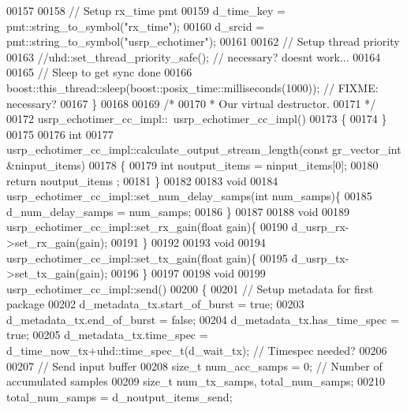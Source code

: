 \begin{DoxyCode}
00157 
00158         \textcolor{comment}{// Setup rx\_time pmt}
00159         d_time_key = pmt::string\_to\_symbol(\textcolor{stringliteral}{"rx\_time"});
00160         d_srcid = pmt::string\_to\_symbol(\textcolor{stringliteral}{"usrp\_echotimer"});
00161 
00162         \textcolor{comment}{// Setup thread priority}
00163         \textcolor{comment}{//uhd::set\_thread\_priority\_safe(); // necessary? doesnt work...}
00164 
00165         \textcolor{comment}{// Sleep to get sync done}
00166         boost::this_thread::sleep(boost::posix\_time::milliseconds(1000)); \textcolor{comment}{// FIXME: necessary?}
00167     \}
00168 
00169     \textcolor{comment}{/*}
00170 \textcolor{comment}{     * Our virtual destructor.}
00171 \textcolor{comment}{     */}
00172     usrp_echotimer_cc_impl::~usrp_echotimer_cc_impl()
00173     \{
00174     \}
00175 
00176     \textcolor{keywordtype}{int}
00177     usrp_echotimer_cc_impl::calculate_output_stream_length(\textcolor{keyword}{const} gr\_vector\_int &ninput\_items)
00178     \{
00179       \textcolor{keywordtype}{int} noutput\_items = ninput\_items[0];
00180       \textcolor{keywordflow}{return} noutput\_items ;
00181     \}
00182 
00183     \textcolor{keywordtype}{void}
00184     usrp_echotimer_cc_impl::set_num_delay_samps(\textcolor{keywordtype}{int} num\_samps)\{
00185         d_num_delay_samps = num\_samps;
00186     \}
00187 
00188     \textcolor{keywordtype}{void}
00189     usrp_echotimer_cc_impl::set_rx_gain(\textcolor{keywordtype}{float} gain)\{
00190         d_usrp_rx->set\_rx\_gain(gain);
00191     \}
00192 
00193     \textcolor{keywordtype}{void}
00194     usrp_echotimer_cc_impl::set_tx_gain(\textcolor{keywordtype}{float} gain)\{
00195         d_usrp_tx->set\_tx\_gain(gain);
00196     \}
00197 
00198     \textcolor{keywordtype}{void}
00199     usrp_echotimer_cc_impl::send()
00200     \{
00201         \textcolor{comment}{// Setup metadata for first package}
00202         d_metadata_tx.start\_of\_burst = \textcolor{keyword}{true};
00203         d_metadata_tx.end\_of\_burst = \textcolor{keyword}{false};
00204         d_metadata_tx.has\_time\_spec = \textcolor{keyword}{true};
00205         d_metadata_tx.time\_spec = d_time_now_tx+uhd::time\_spec\_t(d_wait_tx); \textcolor{comment}{// Timespec needed?}
00206 
00207         \textcolor{comment}{// Send input buffer}
00208         \textcolor{keywordtype}{size\_t} num\_acc\_samps = 0; \textcolor{comment}{// Number of accumulated samples}
00209         \textcolor{keywordtype}{size\_t} num\_tx\_samps, total\_num\_samps;
00210         total\_num\_samps = d_noutput_items_send;

\end{DoxyCode}
